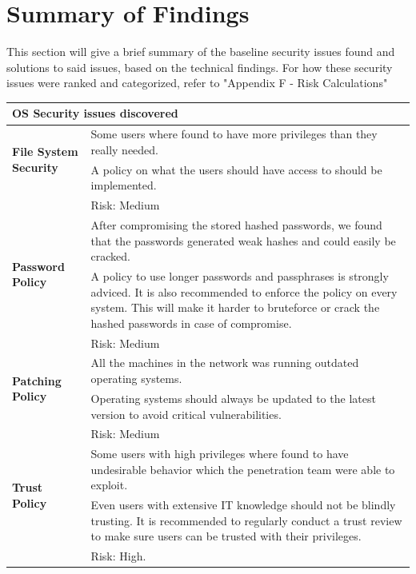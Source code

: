 \section{Summary of Findings}

This section will give a brief summary of the baseline security issues found and solutions to said issues, based on the technical findings. For how these security issues were ranked and categorized, refer to "Appendix F - Risk Calculations"
\begin{longtable}{|l|p{10.5cm}|} 

\hline
\multicolumn{2}{|l|}{\textbf{OS Security issues discovered}}                              \\ \hline
\multirow{2}{*}{\textbf{File System Security}} & Some users where found to have more privileges than they really needed.      \\ \cline{2-2} 
                                               & A policy on what the users should have access to should be implemented. \\ & Risk: Medium \\ \hline



\multirow{2}{*}{\textbf{Password Policy}} &  After compromising the stored hashed passwords, we found that the passwords generated weak hashes and could easily be cracked.    \\ \cline{2-2} 
                                               & A policy to use longer passwords and passphrases is strongly adviced. It is also recommended to enforce the policy on every system. This will make it harder to bruteforce or crack the hashed passwords in case of compromise. \\ & Risk: Medium \\ \hline



\multirow{2}{*}{\textbf{Patching Policy}} & All the machines in the network was running outdated operating systems.    \\ \cline{2-2} 
                                               & Operating systems should always be updated to the latest version to avoid critical vulnerabilities. \\ & Risk: Medium \\ \hline



\multirow{2}{*}{\textbf{Trust Policy}} & Some users with high privileges where found to have undesirable behavior which the penetration team were able to exploit.    \\ \cline{2-2} 
                                               & Even users with extensive IT knowledge should not be blindly trusting. It is recommended to regularly conduct a trust review to make sure users can be trusted with their privileges. \\ & Risk: High. \\ \hline



\end{longtable}
